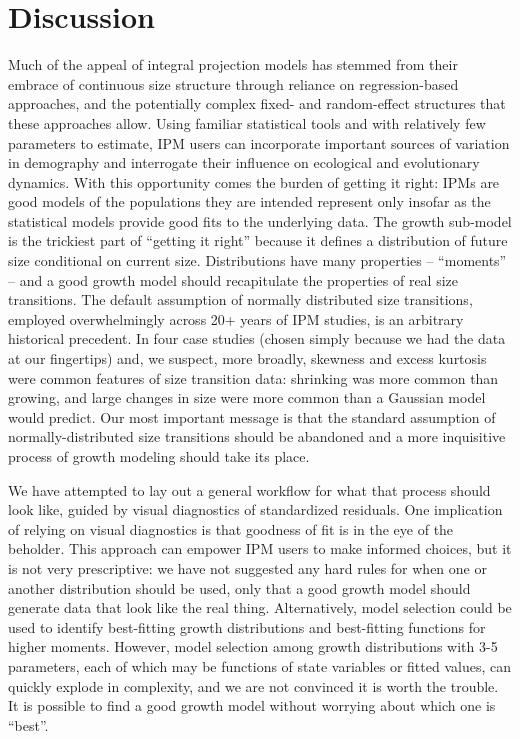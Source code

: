 \documentclass[12pt]{article}
\begin{document}
\section{Discussion}
Much of the appeal of integral projection models has stemmed from their embrace of continuous size structure through reliance on regression-based approaches, and the potentially complex fixed- and random-effect structures that these approaches allow. 
Using familiar statistical tools and with relatively few parameters to estimate, IPM users can incorporate important sources of variation in demography and interrogate their influence on ecological and evolutionary dynamics. 
With this opportunity comes the burden of getting it right: IPMs are good models of the populations they are intended represent only insofar as the statistical models provide good fits to the underlying data. 
The growth sub-model is the trickiest part of ``getting it right'' because it defines a distribution of future size conditional on current size. 
Distributions have many properties -- ``moments'' -- and a good growth model should recapitulate the properties of real size transitions. 
The default assumption of normally distributed size transitions, employed overwhelmingly across 20+ years of IPM studies, is an arbitrary historical precedent. 
In four case studies (chosen simply because we had the data at our fingertips) and, we suspect, more broadly, skewness and excess kurtosis were common features of size transition data: shrinking was more common than growing, and large changes in size were more common than a Gaussian model would predict. 
Our most important message is that the standard assumption of normally-distributed size transitions should be abandoned and a more inquisitive process of growth modeling should take its place. 

We have attempted to lay out a general workflow for what that process should look like, guided by visual diagnostics of standardized residuals. 
One implication of relying on visual diagnostics is that goodness of fit is in the eye of the beholder. 
This approach can empower IPM users to make informed choices, but it is not very prescriptive: we have not suggested any hard rules for when one or another distribution should be used, only that a good growth model should generate data that look like the real thing. 
Alternatively, model selection could be used to identify best-fitting growth distributions and best-fitting functions for higher moments. 
However, model selection among growth distributions with 3-5 parameters, each of which may be functions of state variables or fitted values, can quickly explode in complexity, and we are not convinced it is worth the trouble. 
It is possible to find a good growth model without worrying about which one is ``best''. 
\end{document}
